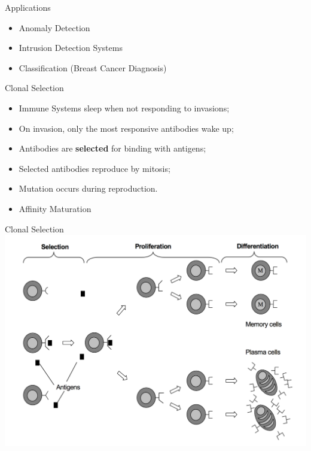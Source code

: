 \documentclass[xcolor=svgnames]{beamer}
\begin{document}
    \begin{frame}{Applications}
        \begin{itemize}
            \item Anomaly Detection
            \item Intrusion Detection Systems
            \item Classification (Breast Cancer Diagnosis)
        \end{itemize}
    \end{frame}
        
    \begin{frame}{Clonal Selection}
        \begin{itemize}
            \item Immune Systems sleep when not responding to invasions;
            \item On invasion, only the most responsive antibodies wake up;
            \item Antibodies are \textbf{selected} for binding with antigens;
            \item Selected antibodies reproduce by mitosis;
            \item Mutation occurs during reproduction.
            \item Affinity Maturation
        \end{itemize}
    \end{frame}
    
    \begin{frame}{Clonal Selection}
        \includegraphics[width=\textwidth]{fig/clonal_selection}
    \end{frame}
    
\end{document}
